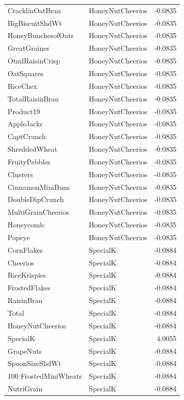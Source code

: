\begin{longtable}{llr}
CracklinOatBran & HoneyNutCheerios & -0.0835 \\
BigBiscuitShdWt & HoneyNutCheerios & -0.0835 \\
HoneyBunchesofOats & HoneyNutCheerios & -0.0835 \\
GreatGraines & HoneyNutCheerios & -0.0835 \\
OtmlRaisinCrisp & HoneyNutCheerios & -0.0835 \\
OatSquares & HoneyNutCheerios & -0.0835 \\
RiceChex & HoneyNutCheerios & -0.0835 \\
TotalRaisinBran & HoneyNutCheerios & -0.0835 \\
Product19 & HoneyNutCheerios & -0.0835 \\
AppleJacks & HoneyNutCheerios & -0.0835 \\
CaptCrunch & HoneyNutCheerios & -0.0835 \\
ShreddedWheat & HoneyNutCheerios & -0.0835 \\
FruityPebbles & HoneyNutCheerios & -0.0835 \\
Clusters & HoneyNutCheerios & -0.0835 \\
CinnamonMiniBuns & HoneyNutCheerios & -0.0835 \\
DoubleDipCrunch & HoneyNutCheerios & -0.0835 \\
MultiGrainCheerios & HoneyNutCheerios & -0.0835 \\
Honeycomb & HoneyNutCheerios & -0.0835 \\
Popeye & HoneyNutCheerios & -0.0835 \\
CornFlakes & SpecialK & -0.0884 \\
Cheerios & SpecialK & -0.0884 \\
RiceKrispies & SpecialK & -0.0884 \\
FrostedFlakes & SpecialK & -0.0884 \\
RaisinBran & SpecialK & -0.0884 \\
Total & SpecialK & -0.0884 \\
HoneyNutCheerios & SpecialK & -0.0884 \\
SpecialK & SpecialK & 4.0055 \\
GrapeNuts & SpecialK & -0.0884 \\
SpoonSizeShdWt & SpecialK & -0.0884 \\
100%
FrostedMiniWheats & SpecialK & -0.0884 \\
NutriGrain & SpecialK & -0.0884 \\

\end{longtable}
